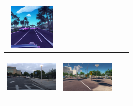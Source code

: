 \documentclass{VUMIFPSbakalaurinis}
\begin{document}
\begin{table}[H]
{\begin{tabular}{|c|c|c|c|}
            \includegraphics[width=100,height=85]{img/diffusion/instruct/7c302d09-d4da21c8} \\
            \hline
            \\
            \includegraphics[width=100,height=85]{img/original/7c2090bd-7b48705f} & 
            \includegraphics[width=100,height=85]{img/diffusion/controlnet/7c2090bd-7b48705f} & 

\end{tabular}}
\end{table}
\end{document}

